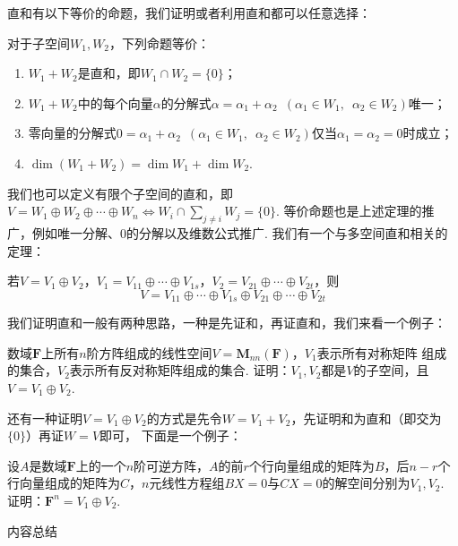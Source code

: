 直和有以下等价的命题，我们证明或者利用直和都可以任意选择：
\begin{theorem}
    对于子空间$W_1,W_2$，下列命题等价：
    \begin{enumerate}[label=(\arabic*)]
        \item $W_1+W_2$是直和，即$W_1 \cap W_2=\{0\}$；

        \item $W_1+W_2$中的每个向量$\alpha$的分解式$\alpha=\alpha_1+\alpha_2\enspace(\alpha_1\in W_1,\enspace\alpha_2\in W_2)$唯一；

        \item 零向量的分解式$0=\alpha_1+\alpha_2 \enspace(\alpha_1\in W_1,\enspace\alpha_2\in W_2)$仅当$\alpha_1=\alpha_2=0$时成立；

        \item $\dim (W_1+W_2)=\dim W_1+\dim W_2$.
    \end{enumerate}
\end{theorem}
我们也可以定义有限个子空间的直和，即$V=W_1\oplus W_2\oplus\cdots\oplus W_n \iff W_i \cap \sum\limits_{j \neq i}W_j=\{0\}$.
等价命题也是上述定理的推广，例如唯一分解、0的分解以及维数公式推广. 我们有一个与多空间直和相关的定理：
\begin{theorem}
    若$V=V_1\oplus V_2$，$V_1=V_{11}\oplus\cdots\oplus V_{1s}$，$V_2=V_{21}\oplus\cdots\oplus V_{2t}$，则
    \[V=V_{11}\oplus\cdots\oplus V_{1s}\oplus V_{21}\oplus\cdots\oplus V_{2t}\]
\end{theorem}
我们证明直和一般有两种思路，一种是先证和，再证直和，我们来看一个例子：
\begin{example}
    数域$\mathbf{F}$上所有$n$阶方阵组成的线性空间$V=\mathbf{M}_{nn}(\mathbf{F})$，$V_1$表示所有对称矩阵
    组成的集合，$V_2$表示所有反对称矩阵组成的集合. 证明：$V_1,V_2$都是$V$的子空间，且$V=V_1\oplus V_2$.
\end{example}
还有一种证明$V=V_1\oplus V_2$的方式是先令$W=V_1+V_2$，先证明和为直和（即交为$\{0\}$）再证$W=V$即可，
下面是一个例子：
\begin{example}
    设$A$是数域$\mathbf{F}$上的一个$n$阶可逆方阵，$A$的前$r$个行向量组成的矩阵为$B$，后$n-r$个
    行向量组成的矩阵为$C$，$n$元线性方程组$BX=0$与$CX=0$的解空间分别为$V_1,V_2$. 证明：$\mathbf{F}^n=V_1\oplus V_2$.
\end{example}

\vspace{2ex}
\centerline{\heiti \Large 内容总结}

\vspace{2ex}

